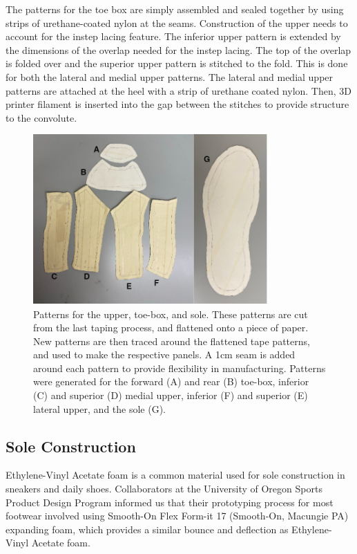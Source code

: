 \documentclass[defaultstyle,11pt]{comps}
\begin{document}
The patterns for the toe box are simply assembled and sealed together by using strips of urethane-coated nylon at the seams.
Construction of the upper needs to account for the instep lacing feature.
The inferior upper pattern is extended by the dimensions of the overlap needed for the instep lacing.
The top of the overlap is folded over and the superior upper pattern is stitched to the fold.
This is done for both the lateral and medial upper patterns.
The lateral and medial upper patterns are attached at the heel with a strip of urethane coated nylon.
Then, 3D printer filament is inserted into the gap between the stitches to provide structure to the convolute.

\begin{figure}
\hypertarget{fig:SA3-cutpatterns}{%
\centering
\includegraphics[width=0.8\textwidth,height=\textheight]{../fig/SA3/cut_patterns.png}
\caption{Patterns for the upper, toe-box, and sole. These patterns are cut from the last taping process, and flattened onto a piece of paper. New patterns are then traced around the flattened tape patterns, and used to make the respective panels. A 1cm seam is added around each pattern to provide flexibility in manufacturing. Patterns were generated for the forward (A) and rear (B) toe-box, inferior (C) and superior (D) medial upper, inferior (F) and superior (E) lateral upper, and the sole (G).}\label{fig:SA3-cutpatterns}
}
\end{figure}

\hypertarget{sole-construction}{%
\subsection{Sole Construction}\label{sole-construction}}

Ethylene-Vinyl Acetate foam is a common material used for sole construction in sneakers and daily shoes.
Collaborators at the University of Oregon Sports Product Design Program informed us that their prototyping process for most footwear involved using Smooth-On Flex Form-it 17 (Smooth-On, Macungie PA) expanding foam, which provides a similar bounce and deflection as Ethylene-Vinyl Acetate foam.
\end{document}
